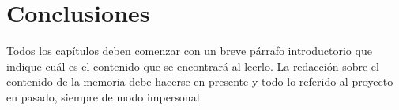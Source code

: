 
\chapter{Conclusiones} %

\label{Chapter5} %
Todos los capítulos deben comenzar con un breve párrafo introductorio que indique cuál es el contenido que se encontrará al leerlo.  La redacción sobre el contenido de la memoria debe hacerse en presente y todo lo referido al proyecto en pasado, siempre de modo impersonal.











